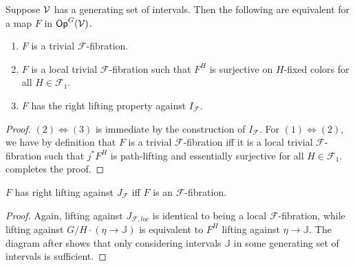 \documentclass[a4paper,10pt
,draft
]{article}%
\renewcommand{\F}{\mathcal F}
\newcommand{\J}{\mathbb J}
\renewcommand{\1}{\eta}%
\begin{document}
\begin{lemma}
      \label{CAV_4.8}
      Suppose $\mathcal V$ has a generating set of intervals.
      Then the following are equivalent for a map $F$ in $\mathsf{Op}^G(\mathcal V)$.
      \begin{enumerate}[label = (\arabic*)]
      \item $F$ is a trivial $\F$-fibration.
      \item $F$ is a local trivial $\F$-fibration such that $F^H$ is surjective on $H$-fixed colors for all $H \in \F_1$.
      \item $F$ has the right lifting property against $I_{\F}$.
      \end{enumerate}
\end{lemma}
\begin{proof}
      $(2) \Leftrightarrow (3)$ is immediate by the construction of $I_{\F}$.
      For $(1) \Leftrightarrow (2)$, we have by definition that
      $F$ is a trivial $\F$-fibration
      iff
      it is a local trivial $\F$-fibration such that $j^*F^H$ is path-lifting and essentially surjective for all $H \in \F_1$.
      \cite[2.4]{BM13} completes the proof. 
\end{proof}

\begin{lemma}
      \label{CAV_4.3}
      $F$ has right lifting against $J_{\F}$ iff $F$ is an $\F$-fibration.
\end{lemma}
\begin{proof}
      Again, lifting against $J_{\F, loc}$ is identical to being a local $\F$-fibration, while lifting against $G/H \cdot (\1 \to \J)$
      is equivalent to $F^H$ lifting against $\1 \to \J$.
      The diagram after \cite[(4.3.2)]{Cav} shows that only considering intervals $\J$ in some generating set of intervals is sufficient.
\end{proof}
\end{document}
